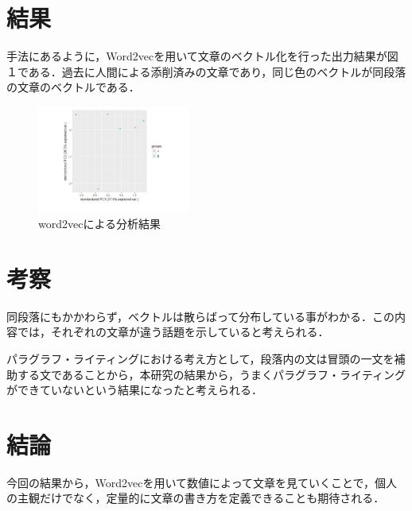 \documentclass[uplatex,twocolumn,dvipdfmx]{jsarticle}
\begin{document}
\section{結果}
手法にあるように，Word2vecを用いて文章のベクトル化を行った出力結果が図１である．過去に人間による添削済みの文章であり，同じ色のベクトルが同段落の文章のベクトルである．
\begin{figure}[h]
\centering
\includegraphics[width=5cm]{02.pdf}
\caption{word2vecによる分析結果}\label{分析結果}
\end{figure}


\section{考察}

同段落にもかかわらず，ベクトルは散らばって分布している事がわかる．この内容では，それぞれの文章が違う話題を示していると考えられる．

パラグラフ・ライティングにおける考え方として，段落内の文は冒頭の一文を補助する文であることから，本研究の結果から，うまくパラグラフ・ライティングができていないという結果になったと考えられる．

\section{結論}

今回の結果から，Word2vecを用いて数値によって文章を見ていくことで，個人の主観だけでなく，定量的に文章の書き方を定義できることも期待される．


\end{document}
